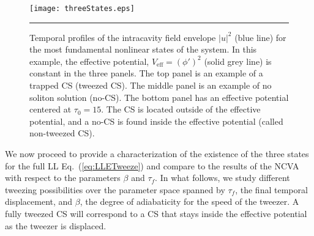 \begin{figure}[htb!]
\centering
\centerline{\texttt{[image: threeStates.eps]}}
  \rule{35em}{0.5pt}
\caption[Temporal Profiles of Fundamental States]{Temporal profiles of the intracavity field envelope $|u|^2$ (blue line) for the most fundamental nonlinear states of the system.  In this example, the effective potential, $V_{\mathrm{eff}} = (\phi')^2$ (solid grey line) is constant in the three panels.  The top panel is an example of a trapped CS (tweezed CS).  The middle panel is an example of no soliton solution (no-CS).  The bottom panel has an effective potential centered at $\tau_0 = 15$.  The CS is located outside of the effective potential, and a no-CS is found inside the effective potential (called non-tweezed CS).  
}
\label{fig:threeStates}
\end{figure}

We now proceed to provide a characterization of the existence of the three states for the full LL Eq.~(\ref{eq:LLETweeze}) and compare to the results of the NCVA with respect to the parameters $\beta$ and $\tau_f$.  In what follows, we study different tweezing possibilities over the parameter space spanned by $\tau_f$, the final temporal displacement, and $\beta$, the degree of adiabaticity for the speed of the tweezer.  A fully tweezed CS will correspond to a CS that stays inside the effective potential as the tweezer is displaced.  

